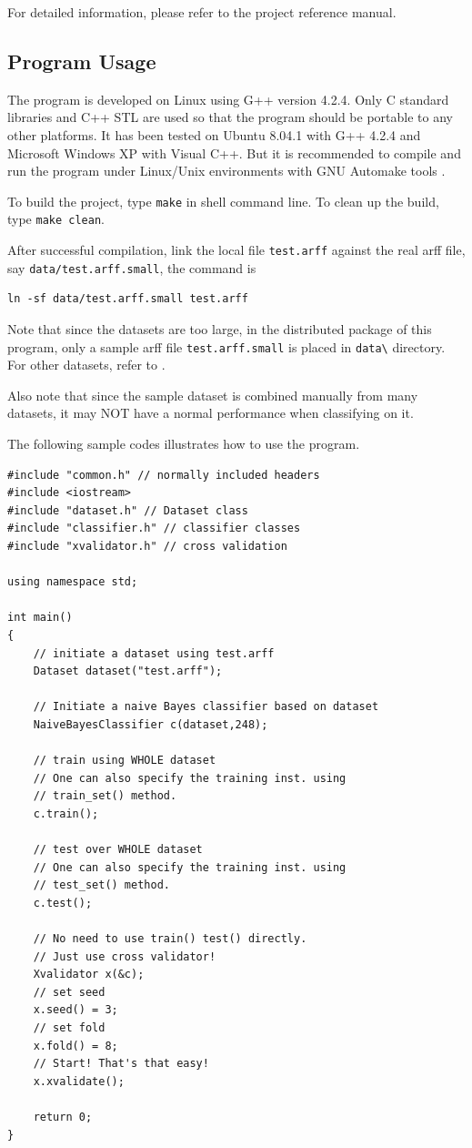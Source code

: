 \documentclass[a4paper,12pt]{article}
\begin{document}
For detailed information, please refer to the project reference manual.

\subsection{Program Usage}
The program is developed on Linux using G++ version 4.2.4. Only C standard libraries and C++ STL are used so that the program should be portable to any other platforms. It has been tested on Ubuntu 8.04.1 with G++ 4.2.4 and Microsoft Windows XP with Visual C++. But it is recommended to compile and run the program under Linux/Unix environments with GNU Automake tools \cite{automake}.

To build the project, type \verb|make| in shell command line. To clean up the build, type \verb|make clean|. 

After successful compilation, link the local file \verb|test.arff| against the real arff file, say \verb|data/test.arff.small|, the command is 

\begin{verbatim}
ln -sf data/test.arff.small test.arff
\end{verbatim}

Note that since the datasets are too large, in the distributed package of this program, only a sample arff file \verb|test.arff.small| is placed in \verb|data\| directory. For other datasets, refer to \cite{moore_website}.

Also note that since the sample dataset is combined manually from many datasets, it may NOT have a normal performance when classifying on it.

The following sample codes illustrates how to use the program.
\singlespacing
\begin{verbatim}
#include "common.h" // normally included headers
#include <iostream>
#include "dataset.h" // Dataset class
#include "classifier.h" // classifier classes
#include "xvalidator.h" // cross validation

using namespace std;

int main()
{
    // initiate a dataset using test.arff
    Dataset dataset("test.arff"); 

    // Initiate a naive Bayes classifier based on dataset
    NaiveBayesClassifier c(dataset,248);

    // train using WHOLE dataset
    // One can also specify the training inst. using
    // train_set() method.
    c.train();

    // test over WHOLE dataset
    // One can also specify the training inst. using
    // test_set() method.
    c.test();

    // No need to use train() test() directly.
    // Just use cross validator!
    Xvalidator x(&c);
    // set seed
    x.seed() = 3;
    // set fold
    x.fold() = 8;
    // Start! That's that easy!
    x.xvalidate();
    
    return 0;
}
\end{verbatim}
\doublespacing
\end{document}
